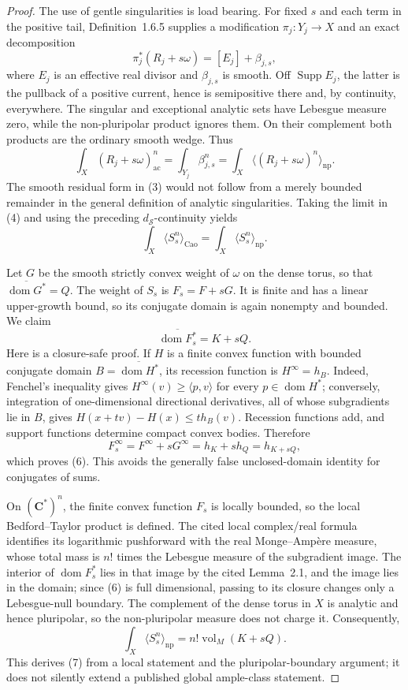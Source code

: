 \begin{proof}
The use of gentle singularities is load bearing.  For fixed \(s\) and each
term in the positive tail, Definition~1.6.5 supplies a modification
\(\pi_j:Y_j\to X\) and an exact decomposition
\[
                 \pi_j^*(R_j+s\omega)=[E_j]+\beta_{j,s},
\tag{3}
\]
where \(E_j\) is an effective real divisor and \(\beta_{j,s}\) is smooth.
Off \(\operatorname{Supp}E_j\), the latter is the pullback of a positive
current, hence is semipositive there and, by continuity, everywhere.  The
singular and exceptional analytic sets have Lebesgue measure zero, while
the non-pluripolar product ignores them.  On their complement both products
are the ordinary smooth wedge.  Thus
\[
 \int_X(R_j+s\omega)_{\mathrm{ac}}^n
 =\int_{Y_j}\beta_{j,s}^n
 =\int_X\langle(R_j+s\omega)^n\rangle_{\mathrm{np}}.
\tag{4}
\]
The smooth residual form in (3) would not follow from a merely bounded
remainder in the general definition of analytic singularities.  Taking the
limit in (4) and using the preceding \(d_{\mathcal S}\)-continuity yields
\[
 \int_X\langle S_s^n\rangle_{\mathrm{Cao}}
 =\int_X\langle S_s^n\rangle_{\mathrm{np}}.
\tag{5}
\]

Let \(G\) be the smooth strictly convex weight of \(\omega\) on the dense
torus, so that
\(\overline{\operatorname{dom}G^*}=Q\).  The weight of \(S_s\) is
\(F_s=F+sG\).  It is finite and has a linear upper-growth bound, so its
conjugate domain is again nonempty and bounded.  We claim
\[
             \overline{\operatorname{dom}F_s^*}=K+sQ.
\tag{6}
\]
Here is a closure-safe proof.  If \(H\) is a finite convex function with
bounded conjugate domain \(B=\overline{\operatorname{dom}H^*}\), its
recession function is \(H^\infty=h_B\).  Indeed, Fenchel's inequality gives
\(H^\infty(v)\geq\langle p,v\rangle\) for every
\(p\in\operatorname{dom}H^*\); conversely, integration of one-dimensional
directional derivatives, all of whose subgradients lie in \(B\), gives
\(H(x+tv)-H(x)\leq t h_B(v)\).  Recession functions add, and support
functions determine compact convex bodies.  Therefore
\[
 F_s^\infty=F^\infty+sG^\infty
            =h_K+s h_Q=h_{K+sQ},
\]
which proves (6).  This avoids the generally false unclosed-domain identity
for conjugates of sums.

On \((\mathbf C^*)^n\), the finite convex function \(F_s\) is locally
bounded, so the local Bedford--Taylor product is defined.  The cited local
complex/real formula identifies its logarithmic pushforward with the real
Monge--Amp\`ere measure, whose total mass is \(n!\) times the Lebesgue
measure of the subgradient image.  The interior of
\(\operatorname{dom}F_s^*\) lies in that image by the cited Lemma~2.1, and
the image lies in the domain; since (6) is full dimensional, passing to its
closure changes only a Lebesgue-null boundary.  The complement of the dense
torus in \(X\) is analytic and hence pluripolar, so the non-pluripolar measure
does not charge it.  Consequently,
\[
 \int_X\langle S_s^n\rangle_{\mathrm{np}}
       =n!\operatorname{vol}_M(K+sQ).
\tag{7}
\]
This derives (7) from a local statement and the pluripolar-boundary
argument; it does not silently extend a published global ample-class
statement.


\end{proof}
